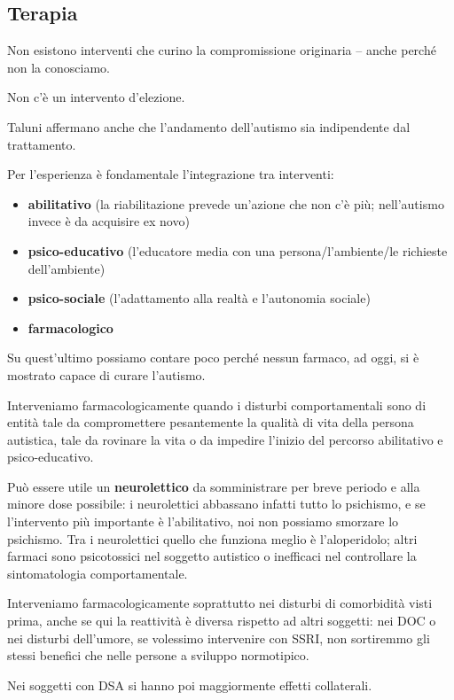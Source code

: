 \subsection{Terapia}

Non esistono interventi che curino la compromissione originaria -- anche
perché non la conosciamo.

Non c'è un intervento d'elezione.

Taluni affermano anche che l'andamento dell'autismo sia indipendente dal
trattamento.

Per l'esperienza è fondamentale l'integrazione tra interventi:

\begin{itemize}
\item
  \textbf{abilitativo} (la riabilitazione prevede un'azione che non c'è
  più; nell'autismo invece è da acquisire ex novo)
\item
  \textbf{psico-educativo} (l'educatore media con una
  persona/l'ambiente/le richieste dell'ambiente)
\item
  \textbf{psico-sociale} (l'adattamento alla realtà e l'autonomia
  sociale)
\item
  \textbf{farmacologico}
\end{itemize}

Su quest'ultimo possiamo contare poco perché nessun farmaco, ad oggi, si
è mostrato capace di curare l'autismo.

Interveniamo farmacologicamente quando i disturbi comportamentali sono
di entità tale da compromettere pesantemente la qualità di vita della
persona autistica, tale da rovinare la vita o da impedire l'inizio del
percorso abilitativo e psico-educativo.

Può essere utile un \textbf{neurolettico} da somministrare per breve
periodo e alla minore dose possibile: i neurolettici abbassano infatti
tutto lo psichismo, e se l'intervento più importante è l'abilitativo,
noi non possiamo smorzare lo psichismo. Tra i neurolettici quello che
funziona meglio è l'aloperidolo; altri farmaci sono psicotossici nel
soggetto autistico o inefficaci nel controllare la sintomatologia
comportamentale.

Interveniamo farmacologicamente soprattutto nei disturbi di comorbidità
visti prima, anche se qui la reattività è diversa rispetto ad altri
soggetti: nei DOC o nei disturbi dell'umore, se volessimo intervenire
con SSRI, non sortiremmo gli stessi benefici che nelle persone a
sviluppo normotipico.

Nei soggetti con DSA si hanno poi maggiormente effetti collaterali.

